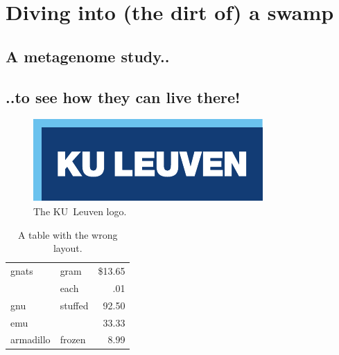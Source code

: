 \chapter{Diving into (the dirt of) a swamp}
\label{cha:4}

\section{A metagenome study..}


\section{..to see how they can live there! }



\begin{figure}
  \centering
  \includegraphics{figures/logokul}
  \caption{The KU~Leuven logo.}
  \label{fig:logo}
\end{figure}






\begin{table}
  \centering
  \begin{tabular}{||l|lr||} \hline
    gnats     & gram      & \$13.65 \\ \cline{2-3}
              & each      & .01 \\ \hline
    gnu       & stuffed   & 92.50 \\ \cline{1-1} \cline{3-3}
    emu       &           & 33.33 \\ \hline
    armadillo & frozen    & 8.99 \\ \hline
  \end{tabular}
  \caption{A table with the wrong layout.}
  \label{tab:wrong}
\end{table}




